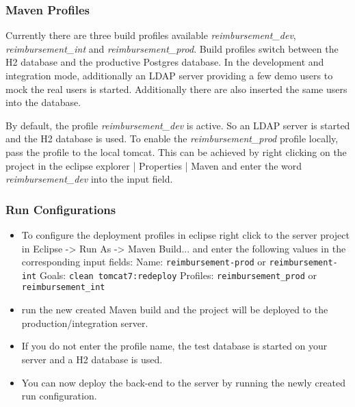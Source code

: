 \subsubsection{Maven Profiles}
\label{sub:profiles}
Currently there are three build profiles available \textit{reimbursement\_dev},  \textit{reimbursement\_int} and \textit{reimbursement\_prod}. Build profiles switch between the H2 database and the productive Postgres database. In the development and integration mode, additionally an LDAP server providing a few demo users to mock the real users is started. Additionally there are also inserted the same users into the database. \par

By default, the profile \textit{reimbursement\_dev} is active. So an LDAP server is started and the H2 database is used. To enable the \textit{reimbursement\_prod} profile locally, pass the profile to the local tomcat. This can be achieved by right clicking on the project in the eclipse explorer | Properties | Maven and enter the word \textit{reimbursement\_dev} into the input field.


\subsubsection{Run Configurations}	
\begin{itemize}
	\item To configure the deployment profiles in eclipse right click to the server project in Eclipse -> Run As -> Maven Build... and enter the following values in the corresponding input fields:
	\newline
	Name: \texttt{reimbursement-prod} or  \texttt{reimbursement-int}
	\newline
	Goals: \texttt{clean tomcat7:redeploy}
	\newline
	Profiles: \texttt{reimbursement\_prod} or \texttt{reimbursement\_int}
	\item run the new created Maven build and the project will be deployed to the production/integration server.
	
	\item If you do not enter the profile name, the test database is started on your server and a H2 database is used.
	\item You can now deploy the back-end to the server by running the newly created run configuration.
\end{itemize}

